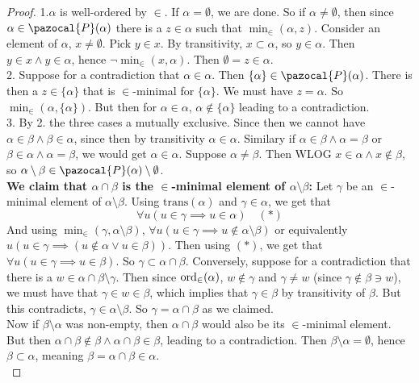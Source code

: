 \begin{proof}
    1.$\alpha$ is well-ordered by $\in$. If $\alpha=\emptyset$, we are done. So if $\alpha\neq \emptyset$, then since $\alpha \in \pazocal{P}(\alpha)$ there is a $z\in \alpha$ such that $\min_\in(\alpha,z)$. Consider an element of $\alpha$, $x\neq \emptyset$. Pick $y\in x$. By transitivity, $x\subset \alpha$, so $y\in \alpha$. Then $y\in x\wedge y\in \alpha$, hence $\neg\min_\in(x,\alpha)$. Then $\emptyset=z\in \alpha$.\\
    2. Suppose for a contradiction that $\alpha\in \alpha$. Then $\{\alpha\}\in\pazocal{P}(\alpha)$. There is then a $z\in \{\alpha\}$ that is $\in$-minimal for $\{\alpha\}$. We must have $z=\alpha$. So $\min_\in(\alpha,\{\alpha\})$. But then for $\alpha\in\alpha$, $\alpha\notin \{\alpha\}$ leading to a contradiction.\\
    3. By 2. the three cases a mutually exclusive. Since then we cannot have $\alpha\in \beta \wedge \beta \in \alpha$, since then by transitivity $\alpha\in\alpha$. Similary if $\alpha\in \beta \wedge \alpha=\beta$ or $\beta\in \alpha \wedge \alpha=\beta$, we would get $\alpha\in\alpha$. Suppose $\alpha\neq \beta$. Then WLOG $x\in \alpha\wedge x\notin \beta$, so $\alpha \setminus \beta \in \pazocal{P}(\alpha)\setminus \emptyset$.\\
    \textbf{We claim that $\alpha\cap \beta$ is the $\in$-minimal element of $\alpha\setminus \beta$:} Let $\gamma$ be an $\in$-minimal element of $\alpha\setminus \beta$. Using $\mathrm{trans}(\alpha)$ and $\gamma\in \alpha$, we get that 
    $$\forall u(u\in \gamma\implies u\in \alpha)\quad (\ast)$$ And using $\min_\in(\gamma,\alpha\setminus \beta)$, $\forall u(u\in \gamma \implies u\notin \alpha\setminus \beta)$ or equivalently $u(u\in \gamma\implies (u\notin \alpha \vee u\in \beta))$. Then using $(\ast)$, we get that $\forall u(u\in\gamma \implies u\in\beta)$. So $\gamma\subset \alpha\cap \beta$. Conversely, suppose for a contradiction that there is a $w\in \alpha\cap \beta \setminus \gamma$. Then since $\mathrm{ord}_\in(\alpha)$, $w\notin\gamma$ and $\gamma\neq w$ (since $\gamma\notin \beta\ni w$), we must have that $\gamma\in w\in \beta$, which implies that $\gamma\in \beta$ by transitivity of $\beta$. But this contradicts, $\gamma\in \alpha\setminus \beta$. So $\gamma = \alpha\cap \beta$ as we claimed.\\
    Now if $\beta\setminus \alpha$ was non-empty, then $\alpha\cap \beta $ would also be its $\in$-minimal element. But then $\alpha\cap \beta \notin \beta \wedge \alpha\cap \beta \in \beta$, leading to a contradiction. Then $\beta\setminus \alpha = \emptyset$, hence $\beta \subset \alpha$, meaning $\beta = \alpha \cap \beta \in \alpha$.\\

\end{proof}
